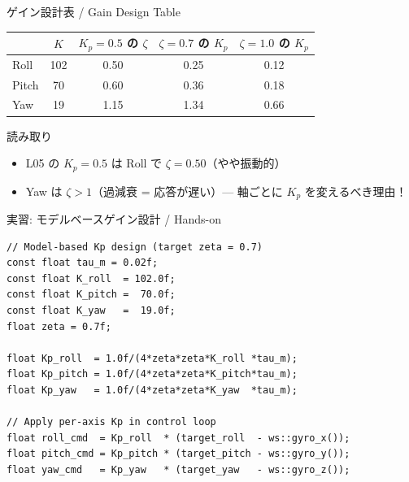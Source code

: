 \begin{frame}{ゲイン設計表 / Gain Design Table}
  \begin{table}
    \centering
    \begin{tabular}{lcccc}
      \hline
      & \textbf{$K$} & \textbf{$K_p=0.5$ の $\zeta$}
      & \textbf{$\zeta=0.7$ の $K_p$} & \textbf{$\zeta=1.0$ の $K_p$} \\
      \hline
      Roll  & 102 & 0.50 & 0.25 & 0.12 \\
      Pitch &  70 & 0.60 & 0.36 & 0.18 \\
      Yaw   &  19 & 1.15 & 1.34 & 0.66 \\
      \hline
    \end{tabular}
  \end{table}

  \vspace{0.5em}

  \begin{exampleblock}{読み取り}
    \begin{itemize}
      \item L05 の $K_p=0.5$ は Roll で $\zeta=0.50$（やや振動的）
      \item Yaw は $\zeta > 1$（過減衰 = 応答が遅い）--- 軸ごとに
            $K_p$ を変えるべき理由！
    \end{itemize}
  \end{exampleblock}
\end{frame}

\begin{frame}[fragile]{実習: モデルベースゲイン設計 / Hands-on}
  \begin{lstlisting}[style=sfcpp, title={user\_code.cpp (excerpt)}]
// Model-based Kp design (target zeta = 0.7)
const float tau_m = 0.02f;
const float K_roll  = 102.0f;
const float K_pitch =  70.0f;
const float K_yaw   =  19.0f;
float zeta = 0.7f;

float Kp_roll  = 1.0f/(4*zeta*zeta*K_roll *tau_m);
float Kp_pitch = 1.0f/(4*zeta*zeta*K_pitch*tau_m);
float Kp_yaw   = 1.0f/(4*zeta*zeta*K_yaw  *tau_m);

// Apply per-axis Kp in control loop
float roll_cmd  = Kp_roll  * (target_roll  - ws::gyro_x());
float pitch_cmd = Kp_pitch * (target_pitch - ws::gyro_y());
float yaw_cmd   = Kp_yaw   * (target_yaw   - ws::gyro_z());
  \end{lstlisting}
\end{frame}

